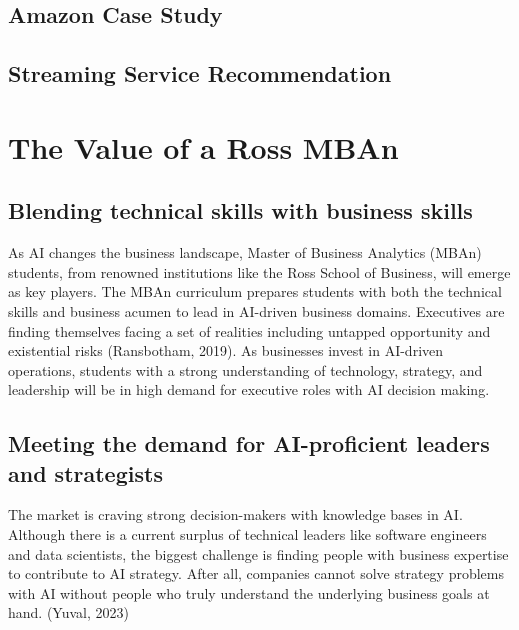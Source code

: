 \documentclass[
]{book}
\begin{document}
\hypertarget{amazon-case-study}{%
\section{Amazon Case Study}\label{amazon-case-study}}

\hypertarget{streaming-service-recommendation}{%
\section{Streaming Service Recommendation}\label{streaming-service-recommendation}}

\hypertarget{the-value-of-a-ross-mban}{%
\chapter{The Value of a Ross MBAn}\label{the-value-of-a-ross-mban}}

\hypertarget{blending-technical-skills-with-business-skills}{%
\section{Blending technical skills with business skills}\label{blending-technical-skills-with-business-skills}}

As AI changes the business landscape, Master of Business Analytics (MBAn) students, from renowned institutions like the Ross School of Business, will emerge as key players. The MBAn curriculum prepares students with both the technical skills and business acumen to lead in AI-driven business domains. Executives are finding themselves facing a set of realities including untapped opportunity and existential risks (Ransbotham, 2019). As businesses invest in AI-driven operations, students with a strong understanding of technology, strategy, and leadership will be in high demand for executive roles with AI decision making.

\hypertarget{meeting-the-demand-for-ai-proficient-leaders-and-strategists}{%
\section{Meeting the demand for AI-proficient leaders and strategists}\label{meeting-the-demand-for-ai-proficient-leaders-and-strategists}}

The market is craving strong decision-makers with knowledge bases in AI. Although there is a current surplus of technical leaders like software engineers and data scientists, the biggest challenge is finding people with business expertise to contribute to AI strategy. After all, companies cannot solve strategy problems with AI without people who truly understand the underlying business goals at hand. (Yuval, 2023)
\end{document}
